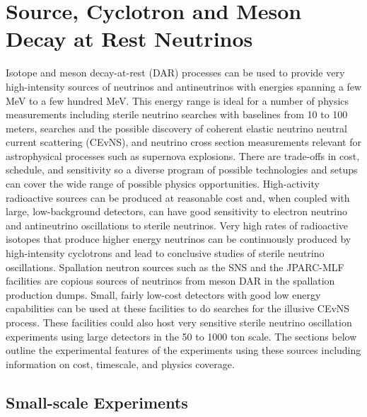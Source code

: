 \section{Source, Cyclotron and Meson Decay at Rest Neutrinos}
\label{sec:SourceCyclotronDAR}

Isotope and meson decay-at-rest (DAR) processes can be used to provide very high-intensity sources of neutrinos and antineutrinos with energies spanning a few MeV to a few hundred MeV.  This energy range is ideal for a number of physics measurements including sterile neutrino searches with baselines from 10 to 100 meters, searches and the possible discovery of coherent elastic neutrino neutral current scattering (CEvNS), and neutrino cross section measurements relevant for astrophysical processes such as supernova explosions.  There are trade-offs in cost, schedule, and sensitivity so a diverse program of possible technologies and setups can cover the wide range of possible physics opportunities.  High-activity radioactive sources can be produced at reasonable cost and, when coupled with large, low-background detectors, can have good sensitivity to electron neutrino and antineutrino oscillations to sterile neutrinos. Very high rates of radioactive isotopes that produce higher energy neutrinos can be continuously produced by high-intensity cyclotrons and lead to conclusive studies of sterile neutrino oscillations.  Spallation neutron sources such as the SNS and the JPARC-MLF facilities are copious sources of neutrinos from meson DAR in the spallation production dumps.  Small, fairly low-cost detectors with good low energy capabilities can be used at these facilities to do searches for the illusive CEvNS process.  These facilities could also host very sensitive sterile neutrino oscillation experiments using large detectors in the 50 to 1000 ton scale.  The sections below outline the experimental features of the experiments using these sources including information on cost, timescale, and physics coverage.

\subsection{Small-scale Experiments}


